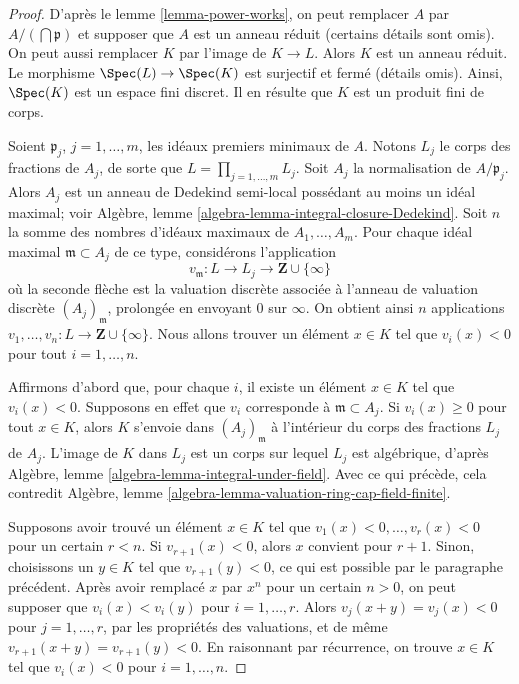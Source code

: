 \begin{proof}
D'après le lemme \ref{lemma-power-works}, on peut remplacer $A$ par
$A/(\bigcap \mathfrak p)$ et supposer que $A$ est un anneau réduit
(certains détails sont omis).
On peut aussi remplacer $K$ par l'image de $K \to L$.
Alors $K$ est un anneau réduit. Le morphisme $\Spec(L) \to \Spec(K)$ est
surjectif et fermé (détails omis). Ainsi, $\Spec(K)$ est un espace fini
discret. Il en résulte que $K$ est un produit fini de corps.

\medskip\noindent
Soient $\mathfrak p_j$, $j = 1, \ldots, m$, les idéaux premiers minimaux de $A$.
Notons $L_j$ le corps des fractions de $A_j$, de sorte que
$L = \prod_{j = 1, \ldots, m} L_j$.
Soit $A_j$ la normalisation de $A/\mathfrak p_j$. Alors
$A_j$ est un anneau de Dedekind semi-local possédant au moins
un idéal maximal; voir
Algèbre, lemme \ref{algebra-lemma-integral-closure-Dedekind}.
Soit $n$ la somme des nombres d'idéaux maximaux
de $A_1, \ldots, A_m$. Pour chaque idéal maximal $\mathfrak m \subset A_j$ de ce type,
considérons l'application
$$
v_{\mathfrak m} : L \to L_j \to \mathbf{Z} \cup \{\infty\}
$$
où la seconde flèche est la valuation discrète associée
à l'anneau de valuation discrète $(A_j)_{\mathfrak m}$, prolongée
en envoyant $0$ sur $\infty$. On obtient ainsi $n$ applications
$v_1, \ldots, v_n : L \to \mathbf{Z} \cup \{\infty\}$.
Nous allons trouver un élément $x \in K$ tel que $v_i(x) < 0$
pour tout $i = 1, \ldots, n$.

\medskip\noindent
Affirmons d'abord que, pour chaque $i$, il existe un élément $x \in K$
tel que $v_i(x) < 0$. Supposons en effet que $v_i$ corresponde à
$\mathfrak m \subset A_j$. Si $v_i(x) \geq 0$ pour tout $x \in K$,
alors $K$ s'envoie dans $(A_j)_{\mathfrak m}$ à l'intérieur du corps des fractions
$L_j$ de $A_j$.
L'image de $K$ dans $L_j$ est un corps sur lequel $L_j$ est
algébrique, d'après Algèbre, lemme \ref{algebra-lemma-integral-under-field}.
Avec ce qui précède, cela contredit Algèbre, lemme
\ref{algebra-lemma-valuation-ring-cap-field-finite}.

\medskip\noindent
Supposons avoir trouvé un élément $x \in K$ tel que
$v_1(x) < 0, \ldots, v_r(x) < 0$ pour un certain $r < n$. Si $v_{r + 1}(x) < 0$,
alors $x$ convient pour $r + 1$. Sinon, choisissons un $y \in K$ tel que
$v_{r + 1}(y) < 0$, ce qui est possible par le paragraphe précédent.
Après avoir remplacé $x$ par $x^n$ pour un certain $n > 0$,
on peut supposer que $v_i(x) < v_i(y)$ pour $i = 1, \ldots, r$. Alors
$v_j(x + y) = v_j(x) < 0$ pour $j = 1, \ldots, r$, par les propriétés
des valuations, et de même $v_{r + 1}(x + y) = v_{r + 1}(y) < 0$.
En raisonnant par récurrence, on trouve
$x \in K$ tel que $v_i(x) < 0$ pour $i = 1, \ldots, n$.


\end{proof}
